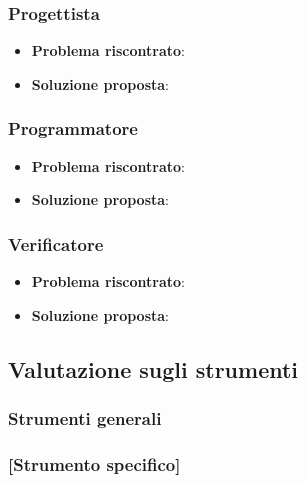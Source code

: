 		\subsubsection{Progettista}
			\begin{itemize}
				\item \textbf{Problema riscontrato}:
				\item \textbf{Soluzione proposta}:
			\end{itemize}

		\subsubsection{Programmatore}
			\begin{itemize}
				\item \textbf{Problema riscontrato}:
				\item \textbf{Soluzione proposta}:
			\end{itemize}

		\subsubsection{Verificatore}
			\begin{itemize}
				\item \textbf{Problema riscontrato}:
				\item \textbf{Soluzione proposta}:
			\end{itemize}

	\subsection{Valutazione sugli strumenti}

		\subsubsection{Strumenti generali}
		\subsubsection{[Strumento specifico]}	